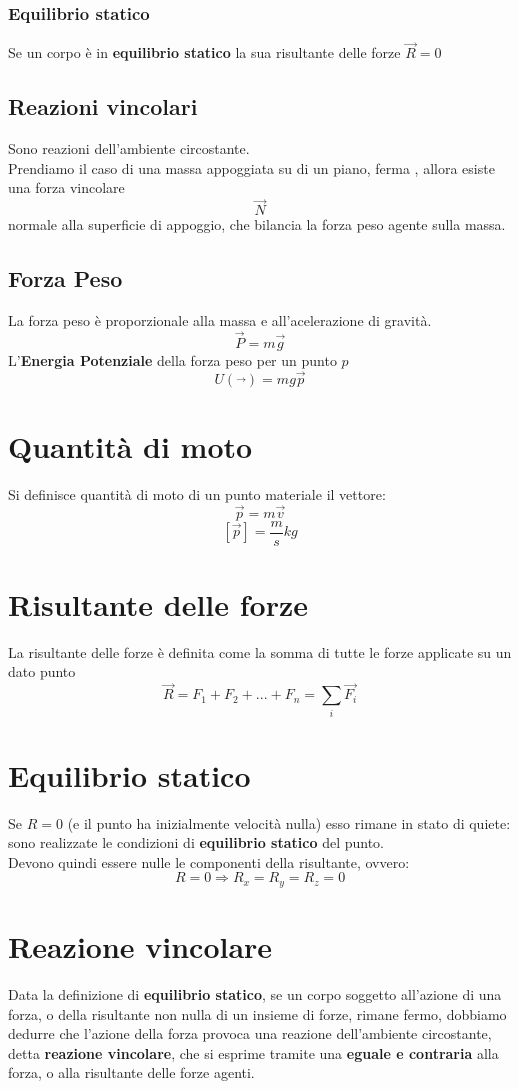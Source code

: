 \documentclass[a4paper]{report}
\begin{document}
  \subsubsection{Equilibrio statico}
  Se un corpo è in \textbf{equilibrio statico} la sua risultante delle forze $\vec{R} = 0$

  \subsection{Reazioni vincolari}
  Sono reazioni dell'ambiente circostante.\\
  Prendiamo il caso di una massa appoggiata su di un piano, ferma , allora esiste una forza vincolare
  $$ \vec{N} $$
  normale alla superficie di appoggio, che bilancia la forza peso agente sulla massa.

  \subsection{Forza Peso}
  La forza peso è proporzionale alla massa e all'acelerazione di gravità.
  $$ \vec{P} = m\vec{g} $$
  L'\textbf{Energia Potenziale} della forza peso per un punto $p$
  $$ U (\vec{}) = mg \vec{p} $$

  \section{Quantità di moto}
  Si definisce quantità di moto di un punto materiale il vettore:
  $$ \vec{p} = m \vec{v} $$
  $$ [\vec{p}] = \frac{m}{s} kg $$

  \section{Risultante delle forze}
  La risultante delle forze è definita come la somma di tutte le forze applicate su un dato punto
  $$ \vec{R} = F_1 + F_2 + ... + F_n = \sum_{i} \vec{F_i} $$

  \section{Equilibrio statico}
  Se $R = 0$ (e il punto ha inizialmente velocità nulla) esso rimane in stato di quiete: sono realizzate le condizioni di \textbf{equilibrio statico} del punto.\\
  Devono quindi essere nulle le componenti della risultante, ovvero:
  $$ R = 0 \Rightarrow R_x = R_y = R_z = 0 $$

  \section{Reazione vincolare}
  Data la definizione di \textbf{equilibrio statico}, se un corpo soggetto all'azione di una forza, o della risultante non nulla di un insieme di forze, rimane fermo, dobbiamo dedurre che l'azione della forza provoca una reazione dell'ambiente circostante, detta \textbf{reazione vincolare}, che si esprime tramite una \textbf{eguale e contraria} alla forza, o alla risultante delle forze agenti.
\end{document}
